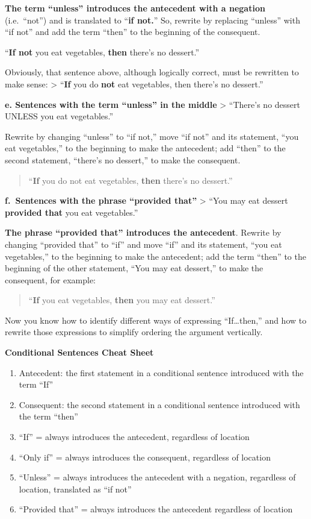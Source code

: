 \documentclass[
]{book}
\providecommand{\tightlist}{%
  \setlength{\itemsep}{0pt}\setlength{\parskip}{0pt}}
\begin{document}
\begin{reflect}
\textbf{The term ``unless'' introduces the antecedent with a negation} (i.e.~``not'') and is translated to ``\textbf{if not.}'' So, rewrite by replacing ``unless'' with ``if not'' and add the term ``then'' to the beginning of the consequent.

``\textbf{If not} you eat vegetables, \textbf{then} there's no dessert.''

Obviously, that sentence above, although logically correct, must be rewritten to make sense:
\textgreater{} ``\textbf{If} you do \textbf{not} eat vegetables, then there's no dessert.''

\textbf{e. Sentences with the term ``unless'' in the middle}
\textgreater{} ``There's no dessert UNLESS you eat vegetables.''

Rewrite by changing ``unless'' to ``if not,'' move ``if not'' and its statement, ``you eat vegetables,'' to the beginning to make the antecedent; add ``then'' to the second statement, ``there's no dessert,'' to make the consequent.

\begin{quote}
``\textbf{If} you do not eat vegetables, \textbf{then} there's no dessert.''
\end{quote}

\textbf{f.~Sentences with the phrase ``provided that''}
\textgreater{} ``You may eat dessert \textbf{provided that} you eat vegetables.''

\textbf{The phrase ``provided that'' introduces the antecedent}. Rewrite by changing ``provided that'' to ``if'' and move ``if'' and its statement, ``you eat vegetables,'' to the beginning to make the antecedent; add the term ``then'' to the beginning of the other statement, ``You may eat dessert,'' to make the consequent, for example:

\begin{quote}
``\textbf{If} you eat vegetables, \textbf{then} you may eat dessert.''
\end{quote}

Now you know how to identify different ways of expressing ``If\ldots then,'' and how to rewrite those expressions to simplify ordering the argument vertically.

\textbf{Conditional Sentences Cheat Sheet}

\begin{enumerate}
\def\labelenumi{\arabic{enumi}.}
\tightlist
\item
  Antecedent: the first statement in a conditional sentence introduced with the term ``If''
\item
  Consequent: the second statement in a conditional sentence introduced with the term ``then''
\item
  ``If'' = always introduces the antecedent, regardless of location
\item
  ``Only if'' = always introduces the consequent, regardless of location
\item
  ``Unless'' = always introduces the antecedent with a negation, regardless of location, translated as ``if not''
\item
  ``Provided that'' = always introduces the antecedent regardless of location
\end{enumerate}


\end{reflect}
\end{document}
